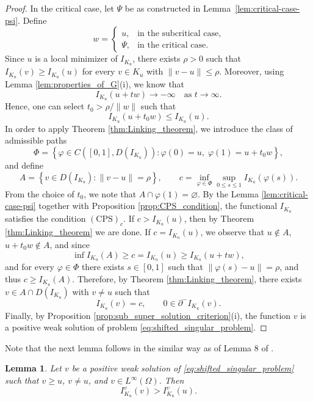 \documentclass[11pt]{article}
\newtheorem{lemma}{Lemma}[section] %
\begin{document}
\begin{proof}
In the critical case, let $\Psi$ be as constructed in Lemma~\ref{lem:critical-case-psi}. Define
\begin{equation*}
w =
\begin{cases}
u, & \text{in the subcritical case}, \\
\Psi, & \text{in the critical case}.
\end{cases}
\end{equation*}
Since $u$ is a local minimizer of $I_{K_u}$, there exists $\rho > 0$ such that $I_{K_u}(v) \ge I_{K_u}(u)$ for every $ v \in K_u $ with $\|v-u\| \le \rho$. Moreover, using Lemma \ref{lem:properties_of_G}(i), we know that
\begin{equation*}
I_{K_u}(u + t w) \to -\infty
\quad \text{as } t \to \infty .
\end{equation*}
Hence, one can select $t_0 > \rho/\|w\|$ such that
\begin{equation*}
I_{K_u}(u + t_0 w) \le I_{K_u}(u).
\end{equation*}
In order to apply Theorem \ref{thm:Linking_theorem}, we introduce the class of admissible paths
\begin{equation*}
\Phi
=
\left\{
\varphi \in C([0,1], D(I_{K_u})) :
\varphi(0)=u,\;
\varphi(1)=u+t_0w
\right\},
\end{equation*}
and define
\begin{equation*}
A
=
\left\{
v \in D(I_{K_u}) : \|v-u\|=\rho
\right\},
\qquad
c
=
\inf_{\varphi \in \Phi}
\sup_{0 \le s \le 1}
I_{K_u}(\varphi(s)).
\end{equation*}
From the choice of $t_0$, we note that $A \cap \varphi(1) = \varnothing $. By the Lemma \ref{lem:critical-case-psi} together with Proposition \ref{prop:CPS_condition}, the functional $I_{K_u}$ satisfies the condition $(\mathrm{CPS})_c$. 
If $c > I_{K_u}(u)$, then by Theorem \ref{thm:Linking_theorem} we are done. 
If $c = I_{K_u}(u)$, we observe that $u \notin A$, $u+t_0w \notin A$, and since
\begin{equation*}
\inf I_{K_u}(A) \ge c = I_{K_u}(u) \ge I_{K_u}(u+tw),
\end{equation*}
and for every $\varphi \in \Phi$ there exists $s \in [0,1]$ such that $\|\varphi(s)-u\| = \rho $, and thus $c \geq I_{K_u}(A)$.
Therefore, by Theorem \ref{thm:Linking_theorem}, there exists $v \in A \cap D(I_{K_u})$ with $v \neq u$ such that
\begin{equation*}
I_{K_u}(v) = c,
\qquad
0 \in \partial^- I_{K_u}(v).
\end{equation*}
Finally, by Proposition \ref{prop:sub_super_solution_criterion}(i), the function $v$ is a positive weak solution of problem \eqref{eq:shifted_singular_problem}.
\end{proof}
Note that the next lemma follows in the similar way as of Lemma $8$ of \cite{hirano_fully_singular}.
\begin{lemma}
Let $v$ be a positive weak solution of \eqref{eq:shifted_singular_problem} such that $v \ge u$, $v \neq u$, and $v \in L^\infty(\Omega)$. Then
\begin{equation*}
I_{K_u}^v(v) > I_{K_u}^v(u).
\end{equation*}
\end{lemma}
\end{document}
